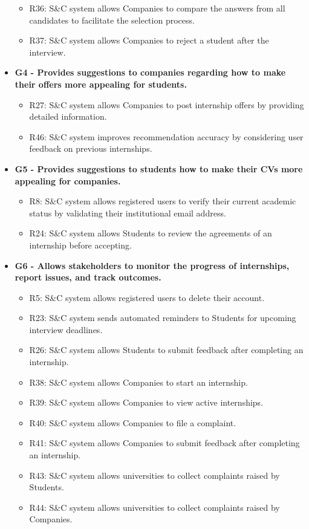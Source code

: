 \begin{itemize}
\begin{itemize}
        \item R36: S\&C system allows Companies to compare the answers from all candidates to facilitate the selection process.
        \item R37: S\&C system allows Companies to reject a student after the interview.
    \end{itemize}
    \item \textbf{G4 - Provides suggestions to companies regarding how to make their offers more appealing for students.}
    \begin{itemize}
        \item R27: S\&C system allows Companies to post internship offers by providing detailed information.
        \item R46: S\&C system improves recommendation accuracy by considering user feedback on previous internships.
    \end{itemize}
    \item \textbf{G5 - Provides suggestions to students how to make their CVs more appealing for companies.}
    \begin{itemize}
        \item R8: S\&C system allows registered users to verify their current academic status by validating their institutional email address.
        \item R24: S\&C system allows Students to review the agreements of an internship before accepting.
    \end{itemize}
    \item \textbf{G6 - Allows stakeholders to monitor the progress of internships, report issues, and track outcomes.}
    \begin{itemize}
        \item R5: S\&C system allows registered users to delete their account.
        \item R23: S\&C system sends automated reminders to Students for upcoming interview deadlines.
        \item R26: S\&C system allows Students to submit feedback after completing an internship.
        \item R38: S\&C system allows Companies to start an internship.
        \item R39: S\&C system allows Companies to view active internships.
        \item R40: S\&C system allows Companies to file a complaint.
        \item R41: S\&C system allows Companies to submit feedback after completing an internship.
        \item R43: S\&C system allows universities to collect complaints raised by Students.
        \item R44: S\&C system allows universities to collect complaints raised by Companies.
    \end{itemize}


\end{itemize}

